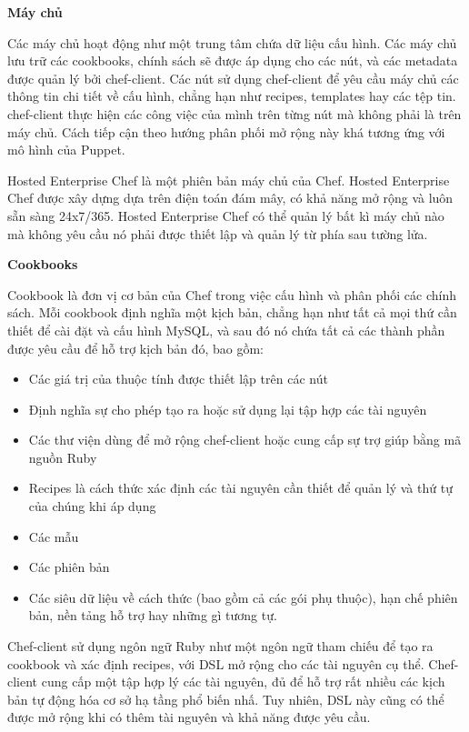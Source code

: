 \textbf{\large Máy chủ}

Các máy chủ hoạt động như một trung tâm chứa dữ liệu cấu hình. Các máy chủ lưu trữ các cookbooks, chính sách sẽ được áp dụng cho các nút, và các metadata được quản lý bởi chef-client. Các nút sử dụng chef-client để yêu cầu máy chủ các thông tin chi tiết về cấu hình, chẳng hạn như recipes, templates hay các tệp tin. chef-client thực hiện các công việc của mình trên từng nút mà không phải là trên máy chủ. Cách tiếp cận theo hướng phân phối mở rộng này khá tương ứng với mô hình của Puppet.

Hosted Enterprise Chef là một phiên bản máy chủ của Chef. Hosted Enterprise Chef được xây dựng dựa trên điện toán đám mây, có khả năng mở rộng và luôn sẵn sàng 24x7/365. Hosted Enterprise Chef có thể quản lý bất kì máy chủ nào mà không yêu cầu nó phải được thiết lập và quản lý từ phía sau tường lửa.

\textbf{\large Cookbooks}


Cookbook là đơn vị cơ bản của Chef trong việc cấu hình và phân phối các chính sách. Mỗi cookbook định nghĩa một kịch bản, chẳng hạn như tất cả mọi thứ cần thiết để cài đặt và cấu hình MySQL, và sau đó nó chứa tất cả các thành phần được yêu cầu để hỗ trợ kịch bản đó, bao gồm:

\begin{itemize}
\item Các giá trị của thuộc tính được thiết lập trên các nút
\item Định nghĩa sự cho phép tạo ra hoặc sử dụng lại tập hợp các tài nguyên
\item Các thư viện dùng để mở rộng chef-client hoặc cung cấp sự trợ giúp bằng mã nguồn Ruby
\item Recipes là cách thức xác định các tài nguyên cần thiết để quản lý và thứ tự của chúng khi áp dụng
\item Các mẫu
\item Các phiên bản
\item Các siêu dữ liệu về cách thức (bao gồm cả các gói phụ thuộc), hạn chế phiên bản, nền tảng hỗ trợ hay những gì tương tự.
\end{itemize}

Chef-client sử dụng ngôn ngữ Ruby như một ngôn ngữ tham chiếu để tạo ra cookbook và xác định recipes, với DSL mở rộng cho các tài nguyên cụ thể. Chef-client cung cấp một tập hợp lý các tài nguyên, đủ để hỗ trợ rất nhiều các kịch bản tự động hóa cơ sở hạ tầng phổ biến nhấ. Tuy nhiên, DSL này cũng có thể được mở rộng khi có thêm tài nguyên và khả năng được yêu cầu.

